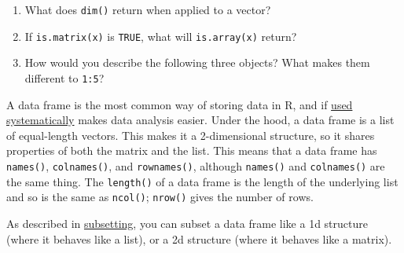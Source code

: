 \begin{enumerate}
\def\labelenumi{\arabic{enumi}.}
\item
  What does \texttt{dim()} return when applied to a vector?
\item
  If \texttt{is.matrix(x)} is \texttt{TRUE}, what will
  \texttt{is.array(x)} return?
\item
  How would you describe the following three objects? What makes them
  different to \texttt{1:5}?

\begin{Shaded}
\begin{Highlighting}[]
\StringTok{ }\NormalTok{(}\NormalTok{:}\NormalTok{, }\NormalTok{(}\NormalTok{, }\NormalTok{, }\NormalTok{))}
\StringTok{ }\NormalTok{(}\NormalTok{:}\NormalTok{, }\NormalTok{(}\NormalTok{, }\NormalTok{, }\NormalTok{))}
\StringTok{ }\NormalTok{(}\NormalTok{:}\NormalTok{, }\NormalTok{(}\NormalTok{, }\NormalTok{, }\NormalTok{))}
\end{Highlighting}
\end{Shaded}
\end{enumerate}


A data frame is the most common way of storing data in R, and if
\href{http://vita.had.co.nz/papers/tidy-data.pdf}{used systematically}
makes data analysis easier. Under the hood, a data frame is a list of
equal-length vectors. This makes it a 2-dimensional structure, so it
shares properties of both the matrix and the list. This means that a
data frame has \texttt{names()}, \texttt{colnames()}, and
\texttt{rownames()}, although \texttt{names()} and \texttt{colnames()}
are the same thing. The \texttt{length()} of a data frame is the length
of the underlying list and so is the same as \texttt{ncol()};
\texttt{nrow()} gives the number of rows. 

As described in \hyperref[subsetting]{subsetting}, you can subset a data
frame like a 1d structure (where it behaves like a list), or a 2d
structure (where it behaves like a matrix).

